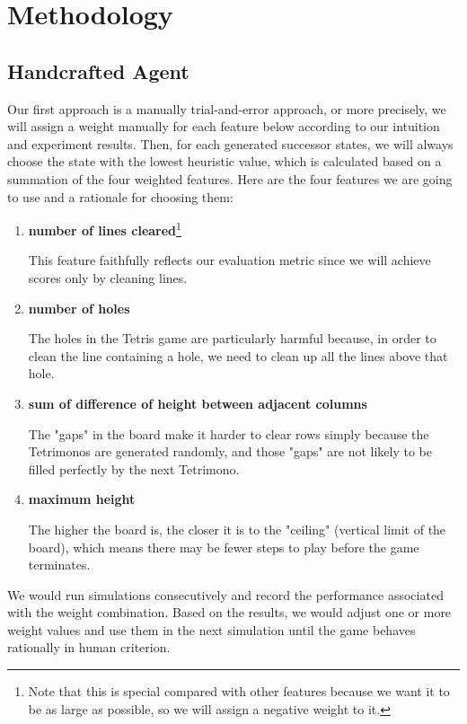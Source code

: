 \documentclass[letterpaper]{article} %
\begin{document}

\section{Methodology}

\subsection{Handcrafted Agent}
Our first approach is a manually trial-and-error approach, or more precisely, we will assign a weight manually for each feature below according to our intuition and experiment results. Then, for each generated successor states, we will always choose the state with the lowest heuristic value, which is calculated based on a summation of the four weighted features. Here are the four features we are going to use and a rationale for choosing them:
\begin{enumerate}
 \item {\bf number of lines cleared}\footnote{Note that this is special compared with other features because we want it to be as large as possible, so we will assign a negative weight to it.}

This feature faithfully reflects our evaluation metric since we will achieve scores only by cleaning lines.

 \item {\bf number of holes}

The holes in the Tetris game are particularly harmful because, in order to clean the line containing a hole, we need to clean up all the lines above that hole. 

 \item {\bf sum of difference of height between adjacent columns}

The "gaps" in the board make it harder to clear rows simply because the Tetrimonos are generated randomly, and those "gaps" are not likely to be filled perfectly by the next Tetrimono.

 \item {\bf maximum height}

The higher the board is, the closer it is to the "ceiling" (vertical limit of the board), which means there may be fewer steps to play before the game terminates.

\end{enumerate}

We would run simulations consecutively and record the performance associated with the weight combination. Based on the results, we would adjust one or more weight values and use them in the next simulation until the game behaves rationally in human criterion.
\end{document}
